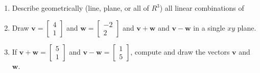 \documentclass[14pt, a4paper]{article}
\begin{document}
\begin{enumerate}
    \item Describe geometrically (line, plane, or all of $R^3$) all linear combinations of
          \begin{enumerate}
          \end{enumerate}
    \item Draw $\boldsymbol{v}=\begin{bmatrix} 4 \\ 1 \end{bmatrix}$ and $\boldsymbol{w}=\begin{bmatrix} -2\\ 2 \end{bmatrix} $ and $\boldsymbol{v}+\boldsymbol{w}$ and $\boldsymbol{v}-\boldsymbol{w}$ in a single $xy$ plane.
    \item If $\boldsymbol{v} + \boldsymbol{w} = \begin{bmatrix} 5 \\ 1 \end{bmatrix}$ and $\boldsymbol{v} - \boldsymbol{w} = \begin{bmatrix} 1 \\ 5 \end{bmatrix}$, compute and draw the vectors $\boldsymbol{v}$ and $\boldsymbol{w}$.

\end{enumerate}
\end{document}
